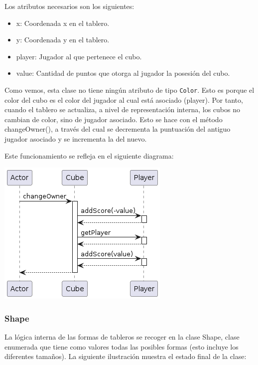 \documentclass[../DocumentoOficial.tex]{subfiles}
\begin{document}
Los atributos necesarios son los siguientes:
\begin{itemize}
\item x: Coordenada x en el tablero.
\item y: Coordenada y en el tablero.
\item player: Jugador al que pertenece el cubo.
\item value: Cantidad de puntos que otorga al jugador la posesión del cubo.
\end{itemize}

Como vemos, esta clase no tiene ningún atributo de tipo \texttt{Color}. Esto es porque el color del cubo es el color del jugador al cual está asociado (player). Por tanto, cuando el tablero se actualiza, a nivel de representación interna, los cubos no cambian de color, sino de jugador asociado. Esto se hace con el método changeOwner(), a través del cual se decrementa la puntuación del antiguo jugador asociado y se incrementa la del nuevo.

Este funcionamiento se refleja en el siguiente diagrama:

\begin{center}
\includegraphics[scale=0.75]{Cube.changeOwner()-sprint7.png} 
\end{center}

\subsubsection{Shape}

La lógica interna de las formas de tableros se recoger en la clase Shape, clase enumerada que tiene como valores todas las posibles formas (esto incluye los diferentes tamaños). La siguiente ilustración muestra el estado final de la clase:
\end{document}

